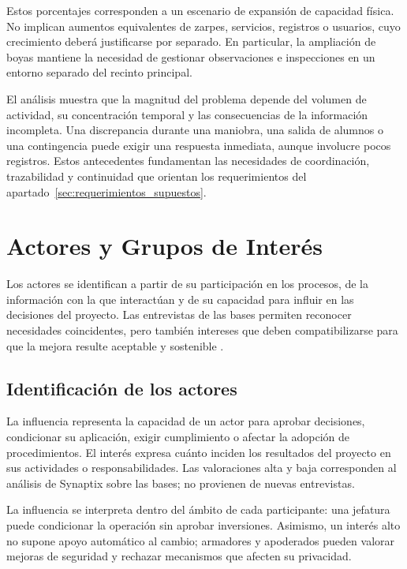 Estos porcentajes corresponden a un escenario de expansión de capacidad física. No implican aumentos equivalentes de zarpes, servicios, registros o usuarios, cuyo crecimiento deberá justificarse por separado. En particular, la ampliación de boyas mantiene la necesidad de gestionar observaciones e inspecciones en un entorno separado del recinto principal.

El análisis muestra que la magnitud del problema depende del volumen de actividad, su concentración temporal y las consecuencias de la información incompleta. Una discrepancia durante una maniobra, una salida de alumnos o una contingencia puede exigir una respuesta inmediata, aunque involucre pocos registros. Estos antecedentes fundamentan las necesidades de coordinación, trazabilidad y continuidad que orientan los requerimientos del apartado~\ref{sec:requerimientos_supuestos}.

\newpage
\section{Actores y Grupos de Interés} %
\label{sec:actores_interes}

Los actores se identifican a partir de su participación en los procesos, de la información con la que interactúan y de su capacidad para influir en las decisiones del proyecto. Las entrevistas de las bases permiten reconocer necesidades coincidentes, pero también intereses que deben compatibilizarse para que la mejora resulte aceptable y sostenible \parencite[cap.~8, pp.~18-23]{pucv-caso07-2026}.


\subsection{Identificación de los actores} %
La influencia representa la capacidad de un actor para aprobar decisiones, condicionar su aplicación, exigir cumplimiento o afectar la adopción de procedimientos. El interés expresa cuánto inciden los resultados del proyecto en sus actividades o responsabilidades. Las valoraciones alta y baja corresponden al análisis de Synaptix sobre las bases; no provienen de nuevas entrevistas.

La influencia se interpreta dentro del ámbito de cada participante: una jefatura puede condicionar la operación sin aprobar inversiones. Asimismo, un interés alto no supone apoyo automático al cambio; armadores y apoderados pueden valorar mejoras de seguridad y rechazar mecanismos que afecten su privacidad.

